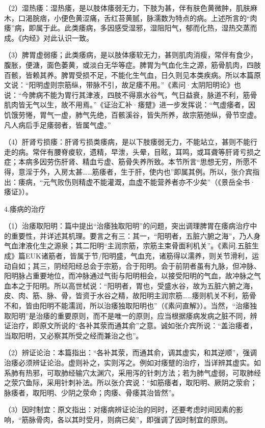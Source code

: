 \documentclass[draft,12pt]{ctexbook}
\begin{document}
（2）湿热痿：湿热痿，是以肢体痿弱无力，下肢为甚，伴有肤色黄微肿，肌肤麻木，口渴脘痞，小便色黄涩痛，舌红苔黄腻，脉濡数为特点的病。上述所言的“肉痿”病，即属于此。此类痿病，多因感受湿邪，湿阻阳气，郁而化热，湿热交蒸而成。《内经》对此认识一致。

（3）脾胃虚弱痿；此类痿病，是以肢体痿软无力，甚则肌肉消瘦，常伴有食少，腹胀，便溏，面色萎黄，或淡白无华等症。脾胃为气血化生之源，筋骨肌肉，四肢百骸，皆赖其养。脾胃受损不足，不能化生气血，日久则见本类疾病。所以本篇原文说：“阳明虚则宗筋纵，带脉不引，故足痿不用。”《素问·太阴阳明论》也说：“今脾病不能为胃行其津液，四肢不得禀水谷气，气日益衰，脉道不利，筋骨肌肉皆无气以生，故不用焉。”《证治汇补·痿躄》进一步发挥说：“气虚痿者，因饥饿劳惓，胃气一虚，肺气先绝，百骸溪谷，皆失所养，故宗筋弛纵，骨节空虚。凡人病后手足痿弱者，皆属气虚。”

（4）肝肾亏损痿：肝肾亏损类痿病，是以下肢痿弱无力，不能站立，甚则不能行走的病。常伴有腰脊痠软，遗精，早泄，头晕，目眩，耳鸣，或耳聋等肝肾亏损之症；本病多因劳伤肝肾、精血亏虚、筋骨失养所致。本节所言“思想无穷，所愿不得，意淫于外，入房太甚……筋痿者，生于肝，使内也”即属其例。所以，张介宾指出：痿病，“元气败伤则精虚不能灌溉，血虚不能营养者亦不少矣”（《景岳全书·痿证》）。

4.痿病的治疗

（1）治痿取阳明：篇中提出“治痿独取阳明”的问题，突出调理脾胃在痿病治疗中的重要性，并详述其机理。要言之有三：其一，“阳明者，五脏六腑之海”，乃人身气血津液化生之源泉；其二阳明“主润宗筋，宗筋主束骨面利机关”。《素问.五脏生成》篇EUK诸筋者，皆属于节/阳明盛，气血充，诸筋得以濡养，则关节滑利，运动自如；其三，阴经阳经总会于宗筋，合于阳明。会于前阴者虽有九脉，但冲脉、阳明脉占重要地位，而冲脉通过气街与阳明相会，以接受阳明的气血，故冲脉之气血本之于阳明。所以高世栻说：“阳明者，胃也，受盛水谷，故为五脏六腑之海，皮、肉、筋、脉、骨，皆资于水谷之精，故阳明主润宗筋……痿则机关不利，筋骨不和，皆由阳明不能濡润，所以治痿独取阳明也”（《素问直解》）。当然，“治痿独取阳明”是治痿的重要原则，而不是唯一的原则，应当根据痿病发病之脏不同，辨证治疗，即原文所说的“各补其荥而通其俞”之意。诚如张介宾所说：“盖治痿者，当取阳明，又必察其所受之经而兼治之也”。

（2）辨证论治：本篇指出：“各补其荥，而通其俞，调其虚实，和其逆顺”，强调治痿必须辨证论治。虚则补之，实则泻之。例如对痿躄的治疗，当详辨其虚实。如系肺有热邪，可取肺经输穴太渊穴，采用泻的针刺方法；若为肺气虚弱，可取肺经之荥穴鱼际，采用针刺补法。所以张介宾说：“如筋痿者，取阳明、厥阴之荥俞；脉痿者，取阳明、少阴之荥命；肉痿、骨痿其治皆然”。

（3）因时制宜：原文指出：对痿病辨证论治的同时，还要考虑时间因素的影响，“筋脉骨肉，各以其时受月，则病已矣”，即强调了因时制宜的原则。
\end{document}
